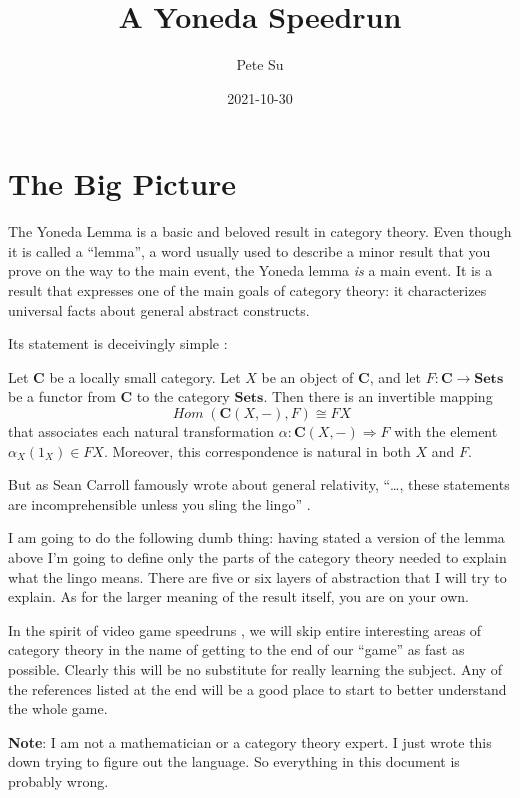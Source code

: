 \documentclass[12pt]{article}
\theoremstyle{definition}
\theoremstyle{definition}
\theoremstyle{definition}
\numberwithin{equation}{section}
\newcommand{\cat}[1]{\mathbf{#1}}      %
\newcommand{\fcat}[1]{{\mathbf {#1}}}    %
\newcommand{\CC}{\cat{C}}
\DeclareMathOperator{\Hom}{\mathit{Hom}}
\newcommand{\Set}{\fcat{Sets}}           %
\newcommand{\iso}{\cong}                %
\newcommand{\fto}{\Rightarrow}
\def\pg{\bigskip\goodbreak\ni}
\def\ni{\goodbreak\noindent}
\begin{document}
\title{\Large A Yoneda Speedrun}
\author{\large Pete Su}
\date{\normalsize 2021-10-30}

\maketitle

\section{The Big Picture}

The Yoneda Lemma is a basic and beloved result in category theory. Even though it is
called a ``lemma'', a word usually used to describe a minor result that you prove on the
way to the main event, the Yoneda lemma {\it is} a main event. It is a result that
expresses one of the main goals of category theory: it characterizes universal facts about
general abstract constructs.

Its statement is deceivingly simple \cite{Riehl2016}:

\pg
Let $\CC$ be a locally small category. Let $X$ be an object of $\CC$, and let $F: \CC \to
\Set$ be a functor from $\CC$ to the category $\Set$. Then there is an invertible mapping
$$
\Hom(\CC(X, -),F) \iso FX
$$
that associates each natural transformation $\alpha:\CC(X,-) \fto F$ with the element
$\alpha_X(1_X) \in FX$. Moreover, this correspondence is natural in both $X$ and $F$.

\pg
But as Sean Carroll famously wrote about general relativity, ``\dots, these statements are
incomprehensible unless you sling the lingo'' \cite{carroll}.

I am going to do the following dumb thing: having stated a version of the lemma above I'm
going to define only the parts of the category theory needed to explain what the lingo
means. There are five or six layers of abstraction that I will 
try to explain. As for the larger meaning of the result itself, you are on your own. 

In the spirit of video game speedruns \cite{lobos}, we will skip entire interesting areas
of category theory in the name of getting to the end of our ``game'' as fast
as possible. Clearly this will be no substitute for really learning the subject. Any of
the references listed at the end will be a good place to start to better understand the
whole game.

\pg
{\bf Note}: I am not a mathematician or a category theory expert. I just wrote this down
trying to figure out the language. So everything in this document is probably wrong.
\end{document}
